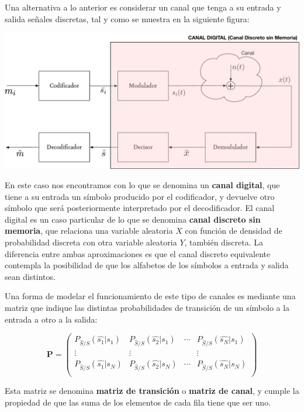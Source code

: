 \documentclass[es,apuntes]{uah}
\begin{document}
Una alternativa a lo anterior es considerar un canal que tenga a su entrada y salida señales discretas, tal y como se muestra en la siguiente figura:

\begin{center}\includegraphics[width=14cm]{../Transparencias/Figuras/Sistema3.pdf}\end{center}

En este caso nos encontramos con lo que se denomina un {\bf canal digital}, que tiene a su entrada un símbolo producido por el codificador, y devuelve otro símbolo que será posteriormente interpretado por el decodificador. El canal digital es un caso particular de lo que se denomina {\bf canal discreto sin memoria}, que relaciona una variable aleatoria $X$ con función de densidad de probabilidad discreta con otra variable aleatoria $Y$, también discreta. La diferencia entre ambas aproximaciones es que el canal discreto equivalente contempla la posibilidad de que los alfabetos de los símbolos a entrada y salida sean distintos. 

Una forma de modelar el funcionamiento de este tipo de canales es mediante una matriz que indique las distintas probabilidades de transición de un símbolo a la entrada a otro a la salida:

\begin{displaymath}
	\mathbf{P} = \left ( \begin{array}{cccc} P_{\hat{S}/S}(\hat{s_1}|s_1) & P_{\hat{S}/S}(\hat{s_2}|s_1) & \cdots &  P_{\hat{S}/S}(\hat{s_N}|s_1) \\ 
	  \vdots & \vdots &  & \vdots \\
	  P_{\hat{S}/S}(\hat{s_1}|s_N) & P_{\hat{S}/S}(\hat{s_2}|s_N) & \cdots &  P_{\hat{S}/S}(\hat{s_N}|s_N) \\ \end{array} \right )
\end{displaymath}

Esta matriz se denomina {\bf matriz de transición} o {\bf matriz de canal}, y cumple la propiedad de que las suma de los elementos de cada fila tiene que ser uno. 
\end{document}
